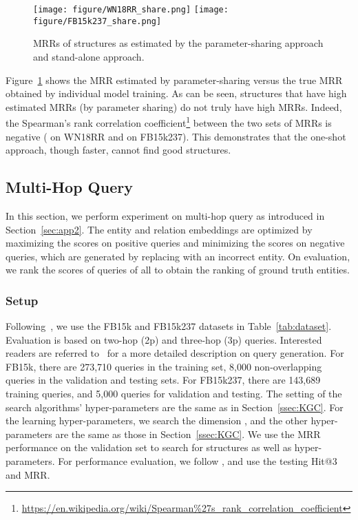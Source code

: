 \documentclass[10pt,journal,compsoc]{IEEEtran}
\begin{document}
\begin{figure}[ht]
	\centering
	\vspace{-5px}
	\texttt{[image: figure/WN18RR\_share.png]}
	\hfill
	\texttt{[image: figure/FB15k237\_share.png]}
	
	\vspace{-10px}
	\caption{
		MRRs of structures as estimated by the parameter-sharing approach and stand-alone
		approach.}
	\label{fig:share}
	\vspace{-6px}
\end{figure}

Figure~\ref{fig:share} shows the 
MRR estimated by parameter-sharing versus 
the true MRR obtained by individual model training.
As can be seen,
structures that have high
estimated MRRs 
(by parameter sharing)
do not truly have 
high MRRs.
Indeed, the Spearman's rank correlation coefficient\footnote{\url{https://en.wikipedia.org/wiki/Spearman\%27s_rank_correlation_coefficient}}
between the two sets of
MRRs is negative
( 
on WN18RR  
and  
on FB15k237).
This demonstrates that 
the one-shot approach, though faster,
cannot find good structures.


\subsection{Multi-Hop Query}
\label{sec:exp:hop}

In this section, we perform experiment on 
multi-hop query
as introduced in Section~\ref{sec:app2}.  
The 
entity and relation
embeddings 
are optimized
by maximizing the scores on positive queries 
and minimizing the scores on negative queries, which 
are generated by replacing  with an incorrect entity.
On evaluation,
we rank the scores of queries   of all 
to obtain the ranking of ground truth entities.


\subsubsection{Setup}

Following~\cite{ren2019query2box},
we use the FB15k and FB15k237 datasets
in Table~\ref{tab:dataset}.
Evaluation is based  on two-hop (2p) and three-hop 
(3p)
queries.
Interested readers are referred to~\cite{ren2019query2box} 
for a more detailed description on query generation.
For FB15k,
there are 273,710 queries in the training set,
8,000 non-overlapping queries in the validation and testing sets.
For FB15k237,
there are 143,689 training queries,
and 5,000 queries for validation and testing.
The setting of the search algorithms' hyper-parameters are 
the same as in Section~\ref{ssec:KGC}.
For the learning hyper-parameters,
we search the dimension ,
and the other hyper-parameters are the same as those in Section~\ref{ssec:KGC}.
We use the MRR performance on the validation set
to search for structures as well as hyper-parameters.
For performance evaluation,  
we follow 
\cite{hamilton2018embedding,ren2019query2box},
and use 
the testing Hit@3 and MRR.
\end{document}
